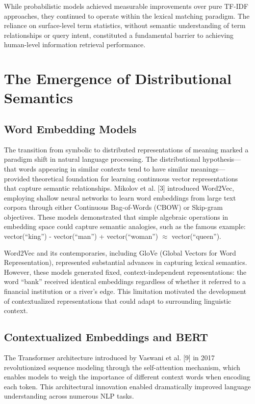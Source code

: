 While probabilistic models achieved measurable improvements over pure TF-IDF approaches, they continued to operate within the lexical matching paradigm. The reliance on surface-level term statistics, without semantic understanding of term relationships or query intent, constituted a fundamental barrier to achieving human-level information retrieval performance.

\section{The Emergence of Distributional Semantics}

\subsection{Word Embedding Models}

The transition from symbolic to distributed representations of meaning marked a paradigm shift in natural language processing. The distributional hypothesis---that words appearing in similar contexts tend to have similar meanings---provided theoretical foundation for learning continuous vector representations that capture semantic relationships. Mikolov et al. [3] introduced Word2Vec, employing shallow neural networks to learn word embeddings from large text corpora through either Continuous Bag-of-Words (CBOW) or Skip-gram objectives. These models demonstrated that simple algebraic operations in embedding space could capture semantic analogies, such as the famous example: vector(``king'') - vector(``man'') + vector(``woman'') $\approx$ vector(``queen'').

Word2Vec and its contemporaries, including GloVe (Global Vectors for Word Representation), represented substantial advances in capturing lexical semantics. However, these models generated fixed, context-independent representations: the word ``bank'' received identical embeddings regardless of whether it referred to a financial institution or a river's edge. This limitation motivated the development of contextualized representations that could adapt to surrounding linguistic context.

\subsection{Contextualized Embeddings and BERT}

The Transformer architecture introduced by Vaswani et al. [9] in 2017 revolutionized sequence modeling through the self-attention mechanism, which enables models to weigh the importance of different context words when encoding each token. This architectural innovation enabled dramatically improved language understanding across numerous NLP tasks.

